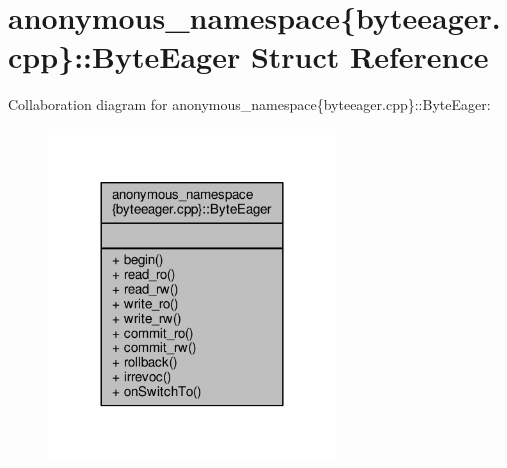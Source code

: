 \hypertarget{structanonymous__namespace_02byteeager_8cpp_03_1_1ByteEager}{\section{anonymous\-\_\-namespace\{byteeager.\-cpp\}\-:\-:Byte\-Eager Struct Reference}
\label{structanonymous__namespace_02byteeager_8cpp_03_1_1ByteEager}
}


Collaboration diagram for anonymous\-\_\-namespace\{byteeager.\-cpp\}\-:\-:Byte\-Eager\-:
\nopagebreak
\begin{figure}[H]
\begin{center}
\leavevmode
\includegraphics[width=216pt]{structanonymous__namespace_02byteeager_8cpp_03_1_1ByteEager__coll__graph}
\end{center}
\end{figure}
